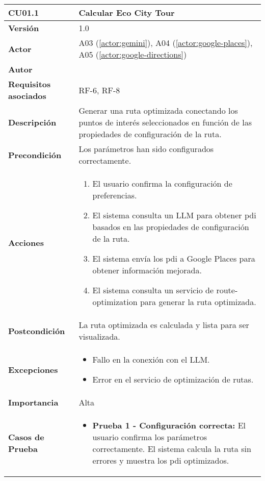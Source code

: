 \begin{table}[H]
	\centering
	\begin{tabularx}{\linewidth}{ p{} p{} }
		\toprule
		\textbf{CU01.1}    & \textbf{Calcular Eco City Tour} \\
		\toprule
		\textbf{Versión}              & 1.0    \\
		\textbf{Actor}                & A03 (\ref{actor:gemini}), A04 (\ref{actor:google-places}), A05 (\ref{actor:google-directions}) \\
		\textbf{Autor}                & \autor \\
		\textbf{Requisitos asociados} & RF-6, RF-8 \\
		\textbf{Descripción}          & Generar una ruta optimizada conectando los puntos de interés seleccionados en función de las propiedades de configuración de la ruta. \\
		\textbf{Precondición}         & Los parámetros han sido configurados correctamente. \\
		\textbf{Acciones}             &
		\begin{enumerate}
			\def\labelenumi{\arabic{enumi}.}
			\tightlist
			\item El usuario confirma la configuración de preferencias.
			\item El sistema consulta un LLM para obtener \acrshort{pdi} basados en las propiedades de configuración de la ruta.
			\item El sistema envía los \acrshort{pdi} a Google Places para obtener información mejorada.
			\item El sistema consulta un servicio de \gls{route-optimization} para generar la ruta optimizada.
		\end{enumerate}\\
		\textbf{Postcondición}        & La ruta optimizada es calculada y lista para ser visualizada. \\
		\textbf{Excepciones}          & 
		\begin{itemize}
			\tightlist
			\item Fallo en la conexión con el LLM.
			\item Error en el servicio de optimización de rutas.
		\end{itemize}\\
		\textbf{Importancia}          & Alta \\
		\textbf{Casos de Prueba}      &
		\begin{itemize}
			\item \textbf{Prueba 1 - Configuración correcta:} El usuario confirma los parámetros correctamente. El sistema calcula la ruta sin errores y muestra los \acrlong{pdi} optimizados.

\end{itemize}
\end{tabularx}
\end{table}
